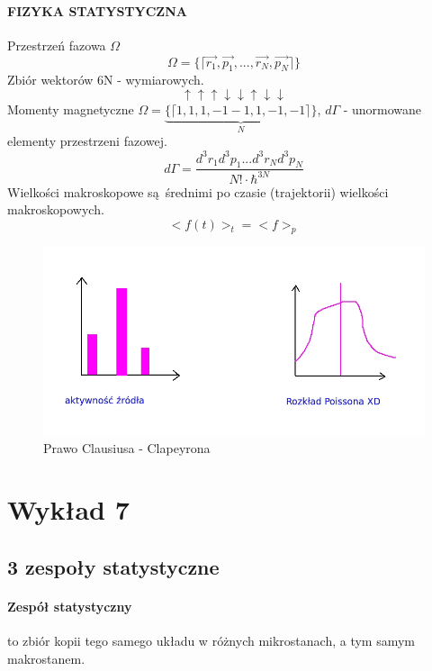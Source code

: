 \documentclass{article}
\begin{document}
		\paragraph{FIZYKA STATYSTYCZNA}
		Przestrzeń fazowa $ \Omega $
		\begin{equation}
		\Omega = \{ \lceil \vec{r_1}, \vec{p_1} ,..., \vec{r_N}, \vec{p_N} \rceil\}
		\end{equation}
		Zbiór wektorów 6N - wymiarowych.
		\begin{equation}
		\uparrow \uparrow \uparrow \downarrow \downarrow \uparrow \downarrow \downarrow 
		\end{equation}
		Momenty magnetyczne $ \Omega = \underbrace{\{ \lceil 1,1,1,-1-1,1,-1,-1 \rceil\}}_{N} $, $ d\Gamma $ - unormowane elementy przestrzeni fazowej.
		\begin{equation}
		d\Gamma = \frac{d^3r_1d^3p_1...d^3r_Nd^3p_N}
		{N!\cdot \hbar^{3N}}
		\end{equation}
		Wielkości makroskopowe są średnimi po czasie (trajektorii) wielkości makroskopowych.
		\begin{equation}
		<f(t)>_t = <f>_p
		\end{equation}
		\begin{figure}[ht]
			\label{fig:fig1}
			\centering
			\includegraphics[scale=0.5]{statystyczna.jpeg}
			\caption{Prawo Clausiusa - Clapeyrona}
		\end{figure}
	\section{Wykład 7}
		\subsection*{3 zespoły statystyczne}
		\paragraph{Zespół statystyczny} to zbiór kopii tego samego układu w różnych mikrostanach, a tym samym makrostanem.
\end{document}

